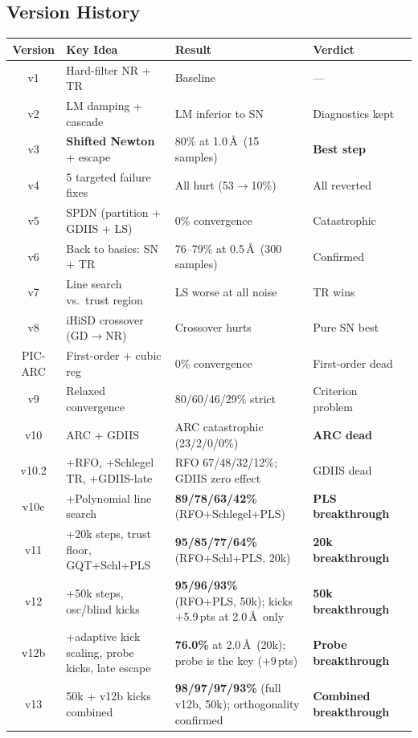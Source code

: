 \documentclass[11pt,a4paper]{article}
\theoremstyle{definition}
\begin{document}
\subsection{Version History}

\begin{longtable}{clp{5cm}p{3cm}l}
\toprule
\textbf{Version} & \textbf{Key Idea} & \textbf{Result} & \textbf{Verdict} \\
\midrule
\endhead

v1 & Hard-filter NR + TR & Baseline & --- \\
v2 & LM damping + cascade & LM inferior to SN & Diagnostics kept \\
v3 & \textbf{Shifted Newton} + escape & 80\% at 1.0\,\AA\ (15 samples) & \textbf{Best step} \\
v4 & 5 targeted failure fixes & All hurt (53$\to$10\%) & All reverted \\
v5 & SPDN (partition + GDIIS + LS) & 0\% convergence & Catastrophic \\
v6 & Back to basics: SN + TR & 76--79\% at 0.5\,\AA\ (300 samples) & Confirmed \\
v7 & Line search vs.\ trust region & LS worse at all noise & TR wins \\
v8 & iHiSD crossover (GD$\to$NR) & Crossover hurts & Pure SN best \\
PIC-ARC & First-order + cubic reg & 0\% convergence & First-order dead \\
v9 & Relaxed convergence & 80/60/46/29\% strict & Criterion problem \\
v10 & ARC + GDIIS & ARC catastrophic (23/2/0/0\%) & \textbf{ARC dead} \\
v10.2 & +RFO, +Schlegel TR, +GDIIS-late & RFO 67/48/32/12\%; GDIIS zero effect & GDIIS dead \\
v10c & +Polynomial line search & \textbf{89/78/63/42\%} (RFO+Schlegel+PLS) & \textbf{PLS breakthrough} \\
v11 & +20k steps, trust floor, GQT+Schl+PLS & \textbf{95/85/77/64\%} (RFO+Schl+PLS, 20k) & \textbf{20k breakthrough} \\
v12 & +50k steps, osc/blind kicks & \textbf{95/96/93\%} (RFO+PLS, 50k); kicks $+$5.9\,pts at 2.0\,\AA\ only & \textbf{50k breakthrough} \\
v12b & +adaptive kick scaling, probe kicks, late escape & \textbf{76.0\%} at 2.0\,\AA\ (20k); probe is the key ($+$9\,pts) & \textbf{Probe breakthrough} \\
v13 & 50k + v12b kicks combined & \textbf{98/97/97/93\%} (full v12b, 50k); orthogonality confirmed & \textbf{Combined breakthrough} \\
\bottomrule
\end{longtable}
\end{document}
